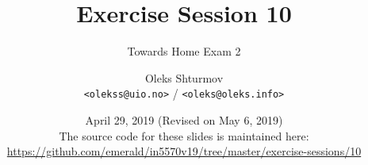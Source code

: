\documentclass[xcolor=table]{beamer}
\title{{\Large Exercise Session 10}}
\subtitle{Towards Home Exam 2}
\institute{{\large University of Oslo}\\[0.2em] IN[59]570: Distributed Objects}
\author{Oleks Shturmov\\[-0.2em]%
  {\tiny \texttt{<olekss@uio.no>} / \texttt{<oleks@oleks.info>}}
}
\date{April 29, 2019 (Revised on May 6, 2019)\\[2em]
{\scriptsize The source code for these slides is maintained here: \\[-0.5em] {\tiny%
\url{https://github.com/emerald/in5570v19/tree/master/exercise-sessions/10}}%
}}
\begin{document}
\begin{frame} \titlepage \end{frame}










\end{document}
